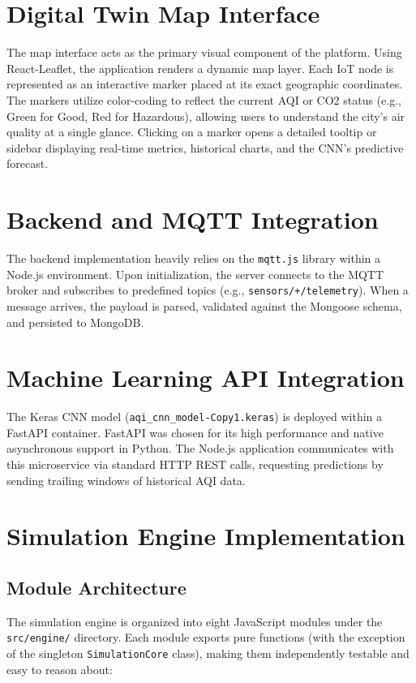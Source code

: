 \documentclass[a4paper, 12pt]{report}
\begin{document}
\section{Digital Twin Map Interface}
The map interface acts as the primary visual component of the platform. Using React-Leaflet, the application renders a dynamic map layer. Each IoT node is represented as an interactive marker placed at its exact geographic coordinates. 
The markers utilize color-coding to reflect the current AQI or CO2 status (e.g., Green for Good, Red for Hazardous), allowing users to understand the city's air quality at a single glance. Clicking on a marker opens a detailed tooltip or sidebar displaying real-time metrics, historical charts, and the CNN's predictive forecast.
\section{Backend and MQTT Integration}
The backend implementation heavily relies on the \texttt{mqtt.js} library within a Node.js environment. Upon initialization, the server connects to the MQTT broker and subscribes to predefined topics (e.g., \texttt{sensors/+/telemetry}). When a message arrives, the payload is parsed, validated against the Mongoose schema, and persisted to MongoDB.
\section{Machine Learning API Integration}
The Keras CNN model (\texttt{aqi\_cnn\_model-Copy1.keras}) is deployed within a FastAPI container. FastAPI was chosen for its high performance and native asynchronous support in Python. The Node.js application communicates with this microservice via standard HTTP REST calls, requesting predictions by sending trailing windows of historical AQI data.

\section{Simulation Engine Implementation}

\subsection{Module Architecture}
The simulation engine is organized into eight JavaScript modules under the \texttt{src/engine/} directory. Each module exports pure functions (with the exception of the singleton \texttt{SimulationCore} class), making them independently testable and easy to reason about:
\end{document}
